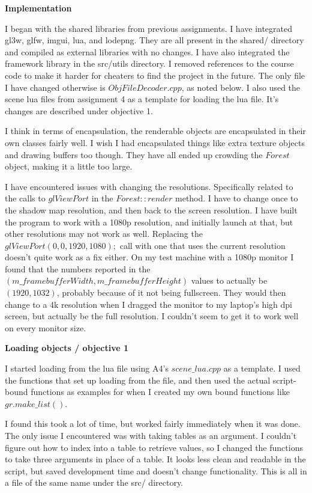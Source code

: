 \documentclass[10pt]{article}
\begin{document}
	
	\begin{center}
		\large\bf Implementation
	\end{center}
	
	I began with the shared libraries from previous assignments. I have integrated gl3w, glfw, imgui, lua, and lodepng. They are all present in the shared/ directory and compiled as external libraries with no changes. I have also integrated the framework library in the src/utils directory. I removed references to the course code to make it harder for cheaters to find the project in the future. The only file I have changed otherwise is $ObjFileDecoder.cpp$, as noted below. I also used the scene lua files from assignment 4 as a template for loading the lua file. It's changes are described under objective 1.
	
	I think in terms of encapsulation, the renderable objects are encapsulated in their own classes fairly well. I wish I had encapsulated things like extra texture objects and drawing buffers too though. They have all ended up crowding the $Forest$ object, making it a little too large.
	
	I have encountered issues with changing the resolutions. Specifically related to the calls to $glViewPort$ in the $Forest::render$ method. I have to change once to the shadow map resolution, and then back to the screen resolution. I have built the program to work with a 1080p resolution, and initially launch at that, but other resolutions may not work as well. Replacing the $glViewPort(0, 0, 1920, 1080);$ call with one that uses the current resolution doesn't quite work as a fix either. On my test machine with a 1080p monitor I found that the numbers reported in the $(m\_framebufferWidth, m\_framebufferHeight)$ values to actually be $(1920, 1032)$, probably because of it not being fullscreen. They would then change to a 4k resolution when I dragged the monitor to my laptop's high dpi screen, but actually be the full resolution. I couldn't seem to get it to work well on every monitor size.
	
	\begin{center}
		\bf Loading objects / objective 1
	\end{center}
	
	I started loading from the lua file using A4's $scene\_lua.cpp$ as a template. I used the functions that set up loading from the file, and then used the actual script-bound functions as examples for when I created my own bound functions like $gr.make\_list()$.
	
	I found this took a lot of time, but worked fairly immediately when it was done. The only issue I encountered was with taking tables as an argument. I couldn't figure out how to index into a table to retrieve values, so I changed the functions to take three arguments in place of a table. It looks less clean and readable in the script, but saved development time and doesn't change functionality. This is all in a file of the same name under the src/ directory.
	
\end{document}
